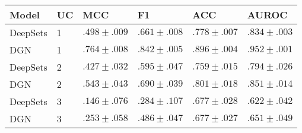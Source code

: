 \begin{tabular}{llllll}
\toprule
Model & UC & \textbf{MCC} & \textbf{F1} & \textbf{ACC} & \textbf{AUROC} \\
\midrule
DeepSets & 1 & $.498\scriptstyle \pm .009$ & $.661\scriptstyle \pm .008$ & $.778\scriptstyle \pm .007$ & $.834\scriptstyle \pm .003$ \\
DGN & 1 & $\mathbf{.764\scriptstyle \pm .008}$ & $\mathbf{.842\scriptstyle \pm .005}$ & $\mathbf{.896\scriptstyle \pm .004}$ & $\mathbf{.952\scriptstyle \pm .001}$ \\
DeepSets & 2 & $.427\scriptstyle \pm .032$ & $.595\scriptstyle \pm .047$ & $.759\scriptstyle \pm .015$ & $.794\scriptstyle \pm .026$ \\
DGN & 2 & $.543\scriptstyle \pm .043$ & $.690\scriptstyle \pm .039$ & $.801\scriptstyle \pm .018$ & $.851\scriptstyle \pm .014$ \\
DeepSets & 3 & $.146\scriptstyle \pm .076$ & $.284\scriptstyle \pm .107$ & $.677\scriptstyle \pm .028$ & $.622\scriptstyle \pm .042$ \\
DGN & 3 & $.253\scriptstyle \pm .058$ & $.486\scriptstyle \pm .047$ & $.677\scriptstyle \pm .027$ & $.651\scriptstyle \pm .049$ \\
\bottomrule
\end{tabular}
